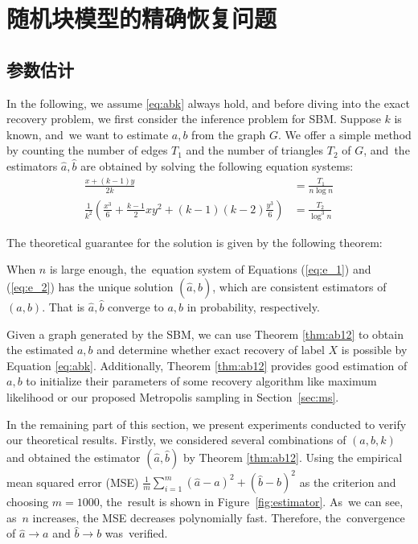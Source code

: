 
\chapter{随机块模型的精确恢复问题}


\section{参数估计}


In the following, we assume \eqref{eq:abk} always hold,
and before diving into the exact recovery problem, we first consider the inference problem for SBM.
Suppose $k$ is known, and~we want to estimate $a,b$ from the graph $G$.
We offer a simple method
by counting the number of edges $T_1$ and the number of triangles $T_2$ of $G$, and~the estimators $\hat{a}, \hat{b}$ are
obtained by solving the following equation systems:
\begin{align}
\frac{x+(k-1)y}{2k} & = \frac{T_1}{n\log n} \label{eq:e_1}\\
\frac{1}{k^2}
\left(\frac{x^3}{6} + \frac{k-1}{2}xy^2 + (k-1)(k-2)\frac{y^3}{6}\right) & = \frac{T_2}{\log^3 n} \label{eq:e_2}
\end{align}

The theoretical guarantee for the solution is given by the following theorem:
\begin{theorem}\label{thm:ab12}
When $n$ is large enough, the~equation system of Equations (\ref{eq:e_1}) and (\ref{eq:e_2}) has the  unique solution $(\hat{a}, \hat{b})$,
which are consistent estimators
of $(a,b)$. That is $\hat{a}, \hat{b}$ converge to $a,b$ in probability, respectively.
\end{theorem}
Given a graph generated by the SBM, we can use Theorem \ref{thm:ab12} to obtain the estimated $a,b$ and determine whether
exact recovery of label $X$ is possible by Equation \eqref{eq:abk}.
Additionally,  Theorem \ref{thm:ab12} provides good estimation of $a,b$ to initialize their parameters of
some recovery algorithm like maximum likelihood or our proposed Metropolis sampling in Section~\ref{sec:ms}.

In the remaining part of this section, we present  experiments conducted to verify our theoretical results.
Firstly, we considered several combinations of $(a,b,k)$ and obtained the estimator $(\hat{a}, \hat{b})$ by Theorem \ref{thm:ab12}. Using
the empirical mean squared error (MSE) $\frac{1}{m} \sum_{i=1}^m (\hat{a}-a)^2 + (\hat{b}-b)^2$ as the criterion
and choosing $m=1000$, the~result is shown in Figure~\ref{fig:estimator}. As~we can see, as~$n$ increases, the MSE decreases polynomially fast. Therefore, the~convergence
of $\hat{a} \to a$ and $\hat{b} \to b$ was~verified.

